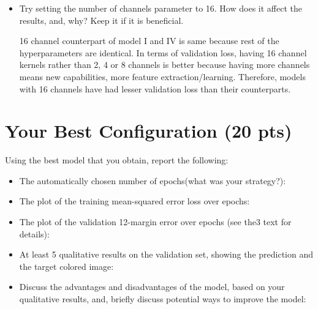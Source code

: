 \documentclass[12pt]{article}
\begin{document}
\begin{itemize}
        \item Try setting the number of channels parameter to 16. How does it affect the results, and, why? Keep it if it is beneficial. 
        
		\begin{minipage}{\textwidth}
			\centering
			\captionsetup{width=.52\textwidth}
		 \end{minipage}
		 
		 16 channel counterpart of model I and IV is same because rest of the hyperparameters are identical. In terms of validation loss, having 16 channel kernels rather than 2, 4 or 8 channels is better because having more channels means new capabilities, more feature extraction/learning. Therefore, models with 16 channels have had lesser validation loss than their counterparts.  
        
    \end{itemize}


\section{Your Best Configuration (20 pts)}
Using the best model that you obtain, report the following:
 
    \begin{itemize}
        \item The automatically chosen number of epochs(what was your strategy?):
        \item The plot of the training mean-squared error loss over epochs:
        \item The  plot  of  the  validation  12-margin  error  over  epochs (see the3 text for details):
        \item At least 5 qualitative results on the validation set, showing the prediction and the target colored image:
        \item Discuss the advantages and disadvantages of the model, based on your qualitative results, and, briefly discuss potential ways to improve the model:
    \end{itemize}
    
\end{document}
